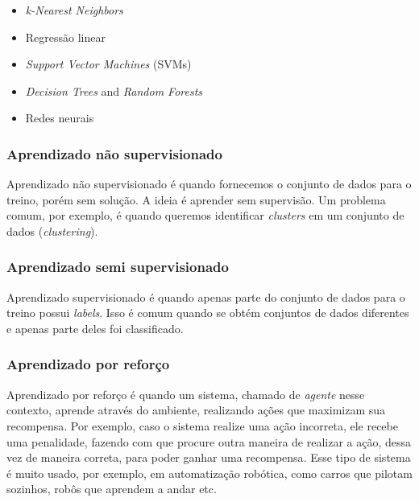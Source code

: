 \documentclass[a4paper,12pt,oneside]{book}
\begin{document}
\begin{itemize}
    \item \textit{k-Nearest Neighbors}\cite{knn}
    \item Regressão linear
    \item \textit{Support Vector Machines} (SVMs)
    \item \textit{Decision Trees} and \textit{Random Forests}
    \item Redes neurais
\end{itemize}

\subsubsection*{Aprendizado não supervisionado}

\par Aprendizado não supervisionado é quando fornecemos o conjunto de dados para o treino, porém sem solução. A ideia é aprender sem supervisão. Um problema comum, por exemplo, é quando queremos identificar \textit{clusters} em um conjunto de dados (\textit{clustering})\cite{unsupervised, knn_uns}.

\subsubsection*{Aprendizado semi supervisionado}

\par Aprendizado supervisionado é quando apenas parte do conjunto de dados para o treino possui \textit{labels}. Isso é comum quando se obtém conjuntos de dados diferentes e apenas parte deles foi classificado\cite{semi_supervised}.

\subsubsection*{Aprendizado por reforço}

\par Aprendizado por reforço é quando um sistema, chamado de \textit{agente} nesse contexto, aprende através do ambiente, realizando ações que maximizam sua recompensa. Por exemplo, caso o sistema realize uma ação incorreta, ele recebe uma penalidade, fazendo com que procure outra maneira de realizar a ação, dessa vez de maneira correta, para poder ganhar uma recompensa\cite{reinforcement}. Esse tipo de sistema é muito usado, por exemplo, em automatização robótica, como carros que pilotam sozinhos, robôs que aprendem a andar etc\cite{robot_ml}.
\end{document}
